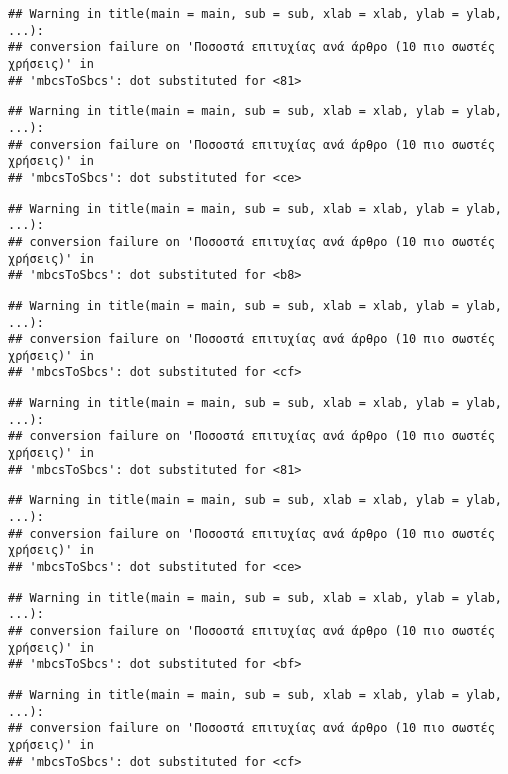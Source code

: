 \documentclass[
]{article}
\begin{document}
\begin{verbatim}
## Warning in title(main = main, sub = sub, xlab = xlab, ylab = ylab, ...):
## conversion failure on 'Ποσοστά επιτυχίας ανά άρθρο (10 πιο σωστές χρήσεις)' in
## 'mbcsToSbcs': dot substituted for <81>
\end{verbatim}

\begin{verbatim}
## Warning in title(main = main, sub = sub, xlab = xlab, ylab = ylab, ...):
## conversion failure on 'Ποσοστά επιτυχίας ανά άρθρο (10 πιο σωστές χρήσεις)' in
## 'mbcsToSbcs': dot substituted for <ce>
\end{verbatim}

\begin{verbatim}
## Warning in title(main = main, sub = sub, xlab = xlab, ylab = ylab, ...):
## conversion failure on 'Ποσοστά επιτυχίας ανά άρθρο (10 πιο σωστές χρήσεις)' in
## 'mbcsToSbcs': dot substituted for <b8>
\end{verbatim}

\begin{verbatim}
## Warning in title(main = main, sub = sub, xlab = xlab, ylab = ylab, ...):
## conversion failure on 'Ποσοστά επιτυχίας ανά άρθρο (10 πιο σωστές χρήσεις)' in
## 'mbcsToSbcs': dot substituted for <cf>
\end{verbatim}

\begin{verbatim}
## Warning in title(main = main, sub = sub, xlab = xlab, ylab = ylab, ...):
## conversion failure on 'Ποσοστά επιτυχίας ανά άρθρο (10 πιο σωστές χρήσεις)' in
## 'mbcsToSbcs': dot substituted for <81>
\end{verbatim}

\begin{verbatim}
## Warning in title(main = main, sub = sub, xlab = xlab, ylab = ylab, ...):
## conversion failure on 'Ποσοστά επιτυχίας ανά άρθρο (10 πιο σωστές χρήσεις)' in
## 'mbcsToSbcs': dot substituted for <ce>
\end{verbatim}

\begin{verbatim}
## Warning in title(main = main, sub = sub, xlab = xlab, ylab = ylab, ...):
## conversion failure on 'Ποσοστά επιτυχίας ανά άρθρο (10 πιο σωστές χρήσεις)' in
## 'mbcsToSbcs': dot substituted for <bf>
\end{verbatim}

\begin{verbatim}
## Warning in title(main = main, sub = sub, xlab = xlab, ylab = ylab, ...):
## conversion failure on 'Ποσοστά επιτυχίας ανά άρθρο (10 πιο σωστές χρήσεις)' in
## 'mbcsToSbcs': dot substituted for <cf>
\end{verbatim}
\end{document}
